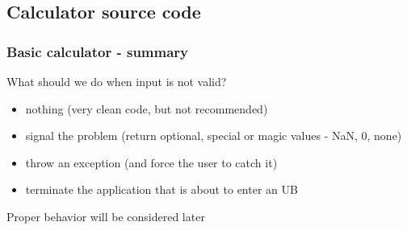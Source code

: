 \documentclass{beamer}
\begin{document}
\subsection{Calculator source code}
\begin{frame}[fragile]
\frametitle{Basic calculator - summary}
What should we do when input is not valid?
\pause
\begin{itemize}[<+->]
  \item nothing (very clean code, but not recommended)
  \item signal the problem (return optional, special or magic values - NaN, 0, none)
  \item throw an exception (and force the user to catch it)
  \item terminate the application that is about to enter an UB
\end{itemize}
\pause
\begin{block}{}
Proper behavior will be considered later
\end{block}
\end{frame}
\end{document}
